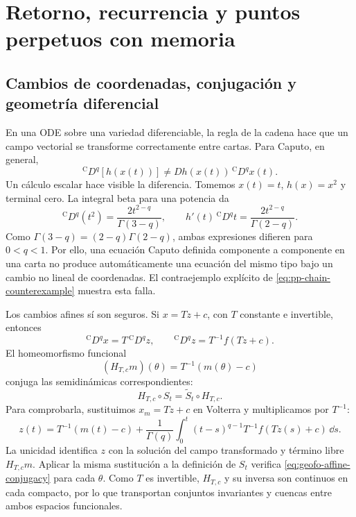 \fi

\ifnum{}\relax
\ifdefined\HAFOCaputoBlockSelect
\section{Retorno, recurrencia y puntos perpetuos con memoria}
\fi
\subsection{Cambios de coordenadas, conjugación y geometría diferencial}

En una ODE sobre una variedad diferenciable, la regla de la cadena hace que un
campo vectorial se transforme correctamente entre cartas. Para Caputo, en
general,
\begin{equation}
 {}^{\mathrm C}D^q[h(x(t))]
 \neq Dh(x(t))\,{}^{\mathrm C}D^qx(t).
 \label{eq:geofo-no-chain-rule}
\end{equation}
Un cálculo escalar hace visible la diferencia. Tomemos \(x(t)=t\),
\(h(x)=x^2\) y terminal cero. La integral beta para una potencia da
\[
 {}^{\mathrm C}D^q(t^2)=\frac{2t^{2-q}}{\Gamma(3-q)},\qquad
 h'(t)\,{}^{\mathrm C}D^qt=\frac{2t^{2-q}}{\Gamma(2-q)}.
\]
Como \(\Gamma(3-q)=(2-q)\Gamma(2-q)\), ambas expresiones difieren
para \(0<q<1\).
Por ello, una ecuación Caputo definida componente a componente en una carta no
produce automáticamente una ecuación del mismo tipo bajo un cambio no lineal
de coordenadas. El contraejemplo explícito de
\cref{eq:pp-chain-counterexample} muestra esta falla.

Los cambios afines sí son seguros. Si \(x=Tz+c\), con \(T\) constante e
invertible, entonces
\begin{equation}
 {}^{\mathrm C}D^qx=T\,{}^{\mathrm C}D^qz,
 \qquad
 {}^{\mathrm C}D^qz=T^{-1}f(Tz+c).
 \label{eq:geofo-affine-transform}
\end{equation}
El homeomorfismo funcional
\begin{equation}
 (H_{T,c}m)(\theta)=T^{-1}(m(\theta)-c)
 \label{eq:geofo-affine-history-map}
\end{equation}
conjuga las semidinámicas correspondientes:
\begin{equation}
 H_{T,c}\circ S_t=\widetilde S_t\circ H_{T,c}.
 \label{eq:geofo-affine-conjugacy}
\end{equation}
Para comprobarla, sustituimos \(x_m=Tz+c\) en Volterra y multiplicamos
por \(T^{-1}\):
\[
 z(t)=T^{-1}(m(t)-c)+\frac1{\Gamma(q)}\int_0^t
 (t-s)^{q-1}T^{-1}f(Tz(s)+c)\,\dd s.
\]
La unicidad identifica \(z\) con la solución del campo transformado y
término libre \(H_{T,c}m\). Aplicar la misma sustitución a la definición
de \(S_t\) verifica \cref{eq:geofo-affine-conjugacy} para cada
\(\theta\). Como \(T\) es invertible, \(H_{T,c}\) y su inversa son
continuos en cada compacto, por lo que transportan conjuntos invariantes y
cuencas entre ambos espacios funcionales.

